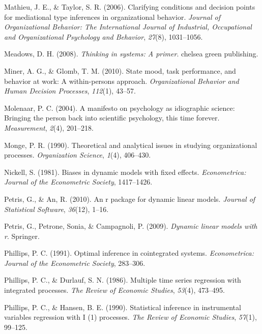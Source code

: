 \documentclass[english,,man]{apa6}
\theoremstyle{definition}
\theoremstyle{definition}
\theoremstyle{definition}
\theoremstyle{remark}
\begin{document}
\leavevmode\hypertarget{ref-mathieu2006clarifying}{}%
Mathieu, J. E., \& Taylor, S. R. (2006). Clarifying conditions and
decision points for mediational type inferences in organizational
behavior. \emph{Journal of Organizational Behavior: The International
Journal of Industrial, Occupational and Organizational Psychology and
Behavior}, \emph{27}(8), 1031--1056.

\leavevmode\hypertarget{ref-meadows2008thinking}{}%
Meadows, D. H. (2008). \emph{Thinking in systems: A primer}. chelsea
green publishing.

\leavevmode\hypertarget{ref-miner2010state}{}%
Miner, A. G., \& Glomb, T. M. (2010). State mood, task performance, and
behavior at work: A within-persons approach. \emph{Organizational
Behavior and Human Decision Processes}, \emph{112}(1), 43--57.

\leavevmode\hypertarget{ref-molenaar_manifesto_2004}{}%
Molenaar, P. C. (2004). A manifesto on psychology as idiographic
science: Bringing the person back into scientific psychology, this time
forever. \emph{Measurement}, \emph{2}(4), 201--218.

\leavevmode\hypertarget{ref-monge_theoretical_1990}{}%
Monge, P. R. (1990). Theoretical and analytical issues in studying
organizational processes. \emph{Organization Science}, \emph{1}(4),
406--430.

\leavevmode\hypertarget{ref-nickell1981biases}{}%
Nickell, S. (1981). Biases in dynamic models with fixed effects.
\emph{Econometrica: Journal of the Econometric Society}, 1417--1426.

\leavevmode\hypertarget{ref-petris2010r}{}%
Petris, G., \& An, R. (2010). An r package for dynamic linear models.
\emph{Journal of Statistical Software}, \emph{36}(12), 1--16.

\leavevmode\hypertarget{ref-petris}{}%
Petris, G., Petrone, Sonia, \& Campagnoli, P. (2009). \emph{Dynamic
linear models with r}. Springer.

\leavevmode\hypertarget{ref-phillips_optimal_1991}{}%
Phillips, P. C. (1991). Optimal inference in cointegrated systems.
\emph{Econometrica: Journal of the Econometric Society}, 283--306.

\leavevmode\hypertarget{ref-phillips_multiple_1986}{}%
Phillips, P. C., \& Durlauf, S. N. (1986). Multiple time series
regression with integrated processes. \emph{The Review of Economic
Studies}, \emph{53}(4), 473--495.

\leavevmode\hypertarget{ref-phillips_statistical_1990}{}%
Phillips, P. C., \& Hansen, B. E. (1990). Statistical inference in
instrumental variables regression with I (1) processes. \emph{The Review
of Economic Studies}, \emph{57}(1), 99--125.
\end{document}
